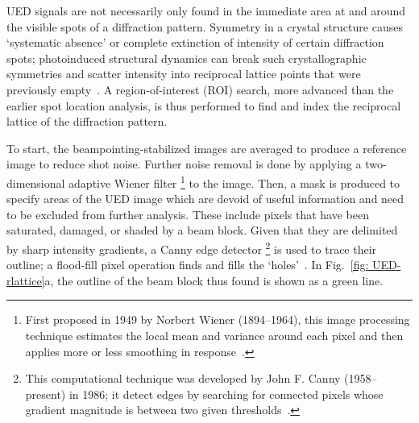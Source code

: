UED signals are not necessarily only found in the immediate area at and around the visible spots
of a diffraction pattern. Symmetry in a crystal structure causes `systematic absence'
or complete extinction of intensity of certain diffraction spots;
photoinduced structural dynamics can break such crystallographic symmetries
and scatter intensity into reciprocal lattice points
that were previously empty~\cite{Brefuel2009, Eichberger2010}.
%
A region-of-interest (ROI) search, more advanced than the earlier spot location analysis,
is thus performed to find and index the reciprocal lattice of the diffraction pattern.

To start, the beampointing-stabilized images are averaged to produce a reference image
to reduce shot noise. Further noise removal is done by applying
a two-dimensional adaptive Wiener filter%
\footnote{First proposed in 1949 by Norbert Wiener (1894--1964),
this image processing technique estimates the local mean and variance around each pixel
and then applies more or less smoothing in response~\cite{Lim1990}.} to the image.
%
Then, a mask is produced to specify areas of the UED image which are devoid of useful information
and need to be excluded from further analysis.
These include pixels that have been saturated, damaged, or shaded by a beam block.
Given that they are delimited by sharp intensity gradients, a Canny edge detector%
\footnote{This computational technique was developed by John F. Canny (1958--present) in 1986;
it detect edges by searching for connected pixels whose gradient magnitude is
between two given thresholds~\cite{Canny1986}.}
is used to trace their outline; a flood-fill pixel operation finds and fills the `holes'~\cite{Soille2004}.
In Fig.~\ref{fig: UED-rlattice}a, the outline of the beam block thus found is shown as a green line.

